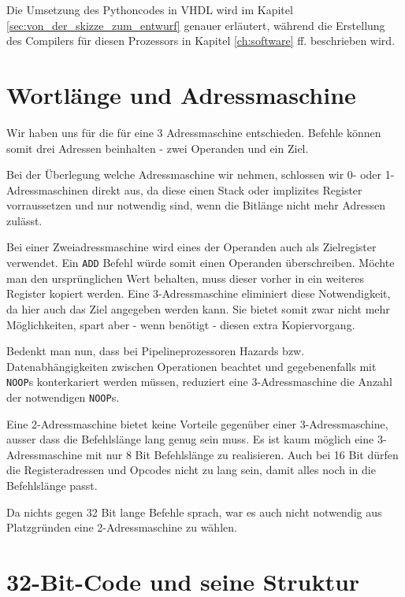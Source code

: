 \documentclass[paper=a4,fontsize=11pt,twocolumn]{scrreprt}
\begin{document}
Die Umsetzung des Pythoncodes in VHDL wird im Kapitel \ref{sec:von_der_skizze_zum_entwurf} genauer erläutert, während die Erstellung des Compilers für diesen Prozessors in Kapitel \ref{ch:software} ff. beschrieben wird.

\section{Wortlänge und Adressmaschine}
\label{sec:wortlaenge_und_adressmaschine}

Wir haben uns für die für eine 3 Adressmaschine entschieden.
Befehle können somit drei Adressen beinhalten - zwei Operanden und ein Ziel.

Bei der Überlegung welche Adressmaschine wir nehmen, schlossen wir 0- oder 1- Adressmaschinen direkt aus, da diese einen Stack oder implizites Register vorraussetzen und nur notwendig sind, wenn die Bitlänge nicht mehr Adressen zulässt.

Bei einer Zweiadressmaschine wird eines der Operanden auch als Zielregister verwendet.
Ein \texttt{ADD} Befehl würde somit einen Operanden überschreiben.
Möchte man den ursprünglichen Wert behalten, muss dieser vorher in ein weiteres Register kopiert werden.
Eine 3-Adressmaschine eliminiert diese Notwendigkeit, da hier auch das Ziel angegeben werden kann.
Sie bietet somit zwar nicht mehr Möglichkeiten, spart aber - wenn benötigt - diesen extra Kopiervorgang.

Bedenkt man nun, dass bei Pipelineprozessoren Hazards bzw. Datenabhängigkeiten zwischen Operationen beachtet und gegebenenfalls mit \texttt{NOOP}s konterkariert werden müssen, reduziert eine 3-Adressmaschine die Anzahl der notwendigen \texttt{NOOP}s.

Eine 2-Adressmaschine bietet keine Vorteile gegenüber einer 3-Adressmaschine, ausser dass die Befehlslänge lang genug sein muss.
Es ist kaum möglich eine 3-Adressmaschine mit nur 8 Bit Befehlslänge zu realisieren.
Auch bei 16 Bit dürfen die Registeradressen und Opcodes nicht zu lang sein, damit alles noch in die Befehlslänge passt.

Da nichts gegen 32 Bit lange Befehle sprach, war es auch nicht notwendig aus Platzgründen eine 2-Adressmaschine zu wählen.

\section{32-Bit-Code und seine Struktur}
\label{sec:32_bit_code_und_seine_Struktur}
\end{document}
